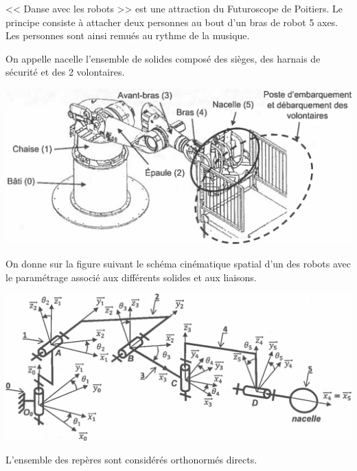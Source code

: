 \documentclass[10pt,fleqn]{article} %
\begin{document}

\vspace{5cm}
\pagestyle{fancy}
\thispagestyle{plain}


\def\columnseprulecolor{\color{ocre}}
\setlength{\columnseprule}{0.4pt} 

\ifprof
\else
\begin{multicols}{2}
\fi

<< Danse avec les robots >> est une attraction du Futuroscope de Poitiers. Le principe consiste à attacher deux personnes au bout d'un bras de robot 5 axes. Les personnes sont ainsi remués au rythme de la musique.

On appelle nacelle l'ensemble de solides composé des sièges, des harnais de sécurité et des 2 volontaires. 

\begin{center}
\includegraphics[width=\linewidth]{images/fig_02}
\end{center}


On donne sur la figure suivant le schéma cinématique spatial d'un des robots avec le paramétrage associé aux différents solides et aux liaisons. 

\begin{center}
\includegraphics[width=\linewidth]{images/fig_03}
\end{center}

L'ensemble des repères sont considérés orthonormés directs.



\end{multicols}
\end{document}
